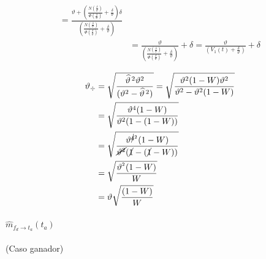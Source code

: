 \documentclass[11pt,twoside,spanish]{report} %
\begin{document}
\begin{equation}
\begin{split}
		=   \frac{\vartheta +\left(\frac{N(\frac{\delta}{\vartheta})}{\Phi(\frac{\delta}{\vartheta})}+ \frac{\delta}{\vartheta}\right)\delta}  {\left(\frac{N(\frac{\delta}{\vartheta})}{\Phi(\frac{\delta}{\vartheta})}+ \frac{\delta}{\vartheta}\right) }\\
		&=   \frac{\vartheta}  {\left(\frac{N(\frac{\delta}{\vartheta})}{\Phi(\frac{\delta}{\vartheta})}+ \frac{\delta}{\vartheta}\right) } +  \delta
		=   \frac{\vartheta}  {\left(V_1(t)+ \frac{\delta}{\vartheta}\right) } +  \delta
	\end{split}
\end{equation}

\begin{equation}
	\begin{split}
		\vartheta_{\div} &= \sqrt{\frac{\widehat{\vartheta}^{\,2}\vartheta^2}{(\vartheta^2 - \widehat{\vartheta}^{\,2})}}
		= \sqrt{\frac{\vartheta^2(1-W)\vartheta^2}{\vartheta^2-\vartheta^2(1-W)}}\\
		&= \sqrt{\frac{\vartheta^4(1-W)}{\vartheta^2(1-(1-W))}}\\
		&= \sqrt{\frac{\vartheta^{\cancel{4}^2}(1-W)}{\cancel{\vartheta^2}(\cancel{1}-(\cancel{1}-W))}}\\
		&= \sqrt{\frac{\vartheta^{^2}(1-W)}{W}}\\
		&=\vartheta \sqrt{\frac{(1-W)}{W}}
	\end{split}
\end{equation}






\paragraph{$\widehat{m}_{f_d \rightarrow t_a}(t_a)$} (Caso ganador)
\end{document}

